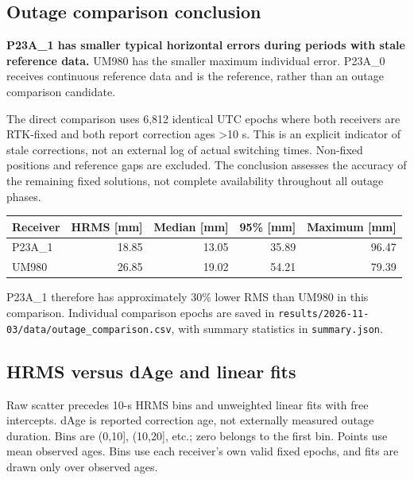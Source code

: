 \documentclass[11pt,a4paper]{article}
\numberwithin{equation}{section}
\numberwithin{figure}{section}
\begin{document}
\subsection{Outage comparison conclusion}

\textbf{P23A\_1 has smaller typical horizontal errors during periods with stale reference data.} UM980 has the smaller maximum individual error. P23A\_0 receives continuous reference data and is the reference, rather than an outage comparison candidate.

The direct comparison uses 6,812 identical UTC epochs where both receivers are RTK-fixed and both report correction ages >10 s. This is an explicit indicator of stale corrections, not an external log of actual switching times. Non-fixed positions and reference gaps are excluded. The conclusion assesses the accuracy of the remaining fixed solutions, not complete availability throughout all outage phases.

\begin{center}\begin{lrbox}{\reporttable}\small\setlength{\tabcolsep}{4pt}\begin{tabular}{lrrrr}\toprule
Receiver & HRMS [mm] & Median [mm] & 95\% [mm] & Maximum [mm]\\\midrule
P23A\_1 & 18.85 & 13.05 & 35.89 & 96.47\\
UM980 & 26.85 & 19.02 & 54.21 & 79.39\\
\bottomrule\end{tabular}\end{lrbox}\ifdim\wd\reporttable>\linewidth\resizebox{\linewidth}{!}{\usebox{\reporttable}}\else\usebox{\reporttable}\fi\end{center}

P23A\_1 therefore has approximately 30\% lower RMS than UM980 in this comparison. Individual comparison epochs are saved in {\small\texttt{results/\allowbreak{}2026-11-03/\allowbreak{}data/\allowbreak{}outage\_\allowbreak{}comparison.csv}}, with summary statistics in {\small\texttt{summary.json}}.

\subsection{HRMS versus dAge and linear fits}

Raw scatter precedes 10-s HRMS bins and unweighted linear fits with free intercepts. dAge is reported correction age, not externally measured outage duration. Bins are (0,10], (10,20], etc.; zero belongs to the first bin. Points use mean observed ages. Bins use each receiver’s own valid fixed epochs, and fits are drawn only over observed ages.
\end{document}
